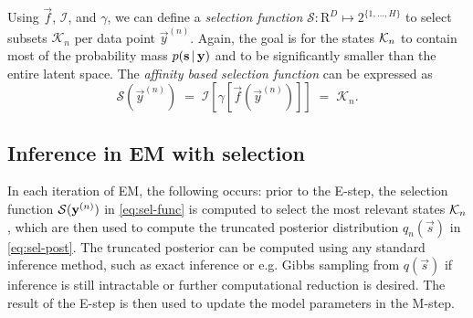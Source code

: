 Using $\vec{f}$, $\mathcal{I}$, and $\gamma$, we can define a 
\emph{selection function} $\mathcal{S}: \mathrm{R}^D \mapsto 2^{ \{1,\dots,H \}}$ 
to select subsets $\mathcal{K}_n$ per data point $\vec{y}^{(n)}$.   
Again, the goal is for the states $\mathcal{K}_{n}$ to contain most of the probability mass
$p({\mathbf{s}} \, | \, {\mathbf{y}})$ and to be significantly smaller than the entire
latent space.  
%
The \textit{affinity based selection function}  can be expressed as
%
\vspace{-.1cm}
\begin{equation}\label{eq:sel-func}
\mathcal{S}(\vec{y}^{(n)}) \;=\; \mathcal{I} \left[  \gamma \left[ \vec{f}(\vec{y}^{(n)}) \right]  \right] \;=\; \mathcal{K}_n.
\end{equation}
%


\subsection{Inference in EM with selection}
%
In each iteration of EM, the following occurs: 
prior to the E-step, the selection function $\mathcal{S}({\mathbf{y}}^{(n)})$ in \eqref{eq:sel-func} is computed to select the most relevant states $\mathcal{K}_{n}$, 
which are then used to compute the truncated posterior distribution $q_n(\vec{s})$ in \eqref{eq:sel-post}.
The truncated posterior can be computed using any standard inference method, 
such as exact inference or e.g. Gibbs sampling from $q(\vec{s})$  %
if inference is still intractable or further computational reduction is desired.
The result of the E-step is then used to update the model parameters in the M-step. 



